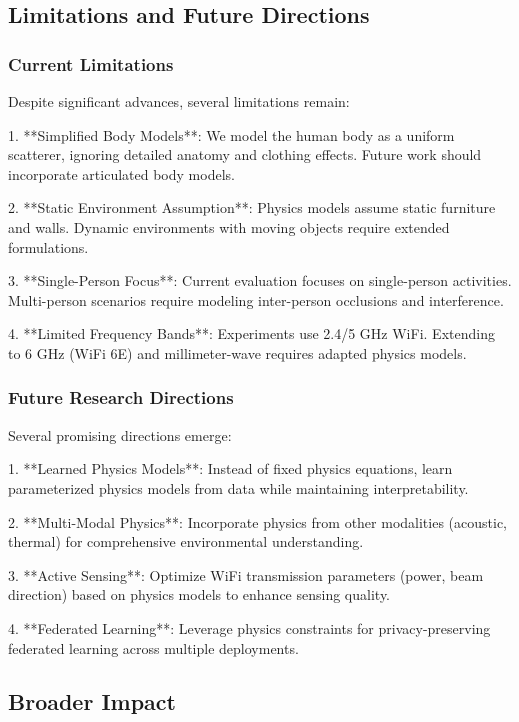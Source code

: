 \documentclass[10pt,journal,compsoc]{IEEEtran}
\begin{document}
\subsection{Limitations and Future Directions}

\subsubsection{Current Limitations}

Despite significant advances, several limitations remain:

1. **Simplified Body Models**: We model the human body as a uniform scatterer, ignoring detailed anatomy and clothing effects. Future work should incorporate articulated body models.

2. **Static Environment Assumption**: Physics models assume static furniture and walls. Dynamic environments with moving objects require extended formulations.

3. **Single-Person Focus**: Current evaluation focuses on single-person activities. Multi-person scenarios require modeling inter-person occlusions and interference.

4. **Limited Frequency Bands**: Experiments use 2.4/5 GHz WiFi. Extending to 6 GHz (WiFi 6E) and millimeter-wave requires adapted physics models.

\subsubsection{Future Research Directions}

Several promising directions emerge:

1. **Learned Physics Models**: Instead of fixed physics equations, learn parameterized physics models from data while maintaining interpretability.

2. **Multi-Modal Physics**: Incorporate physics from other modalities (acoustic, thermal) for comprehensive environmental understanding.

3. **Active Sensing**: Optimize WiFi transmission parameters (power, beam direction) based on physics models to enhance sensing quality.

4. **Federated Learning**: Leverage physics constraints for privacy-preserving federated learning across multiple deployments.

\subsection{Broader Impact}
\end{document}
